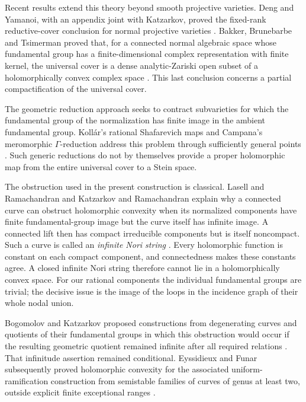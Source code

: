 Recent results extend this theory beyond smooth projective varieties.
Deng and Yamanoi, with an appendix joint with Katzarkov, proved the
fixed-rank reductive-cover conclusion for normal projective varieties
\citep[Theorem~C(i)]{DengYamanoi2024}. Bakker, Brunebarbe and Tsimerman
proved that, for a connected normal algebraic space whose fundamental
group has a finite-dimensional complex representation with finite
kernel, the universal cover is a dense analytic-Zariski open subset
of a holomorphically convex complex space
\citep[Theorem~1.1]{BakkerBrunebarbeTsimerman2026}. This last conclusion
concerns a partial compactification of the universal cover.

The geometric reduction approach seeks to contract subvarieties for which
the fundamental group of the normalization has finite image in the ambient
fundamental group. Koll\'ar's rational Shafarevich maps
and Campana's meromorphic $\Gamma$-reduction address this problem through
sufficiently general points \citep[\S1]{Kollar1993}
\citep[Theorem~3.5 and Definition~3.8]{Campana1994}.
Such generic reductions do not by themselves provide a proper holomorphic
map from the entire universal cover to a Stein space.

The obstruction used in the present construction is classical.
Lasell and Ramachandran \citep[pp.~136--137]{LasellRamachandran1996}
and Katzarkov and Ramachandran
\citep[pp.~527--528]{KatzarkovRamachandran1998} explain why a
connected curve can obstruct holomorphic convexity when its normalized
components have finite fundamental-group image but the curve itself has
infinite image. A connected lift then has compact irreducible
components but is itself noncompact. Such a curve is called an
\emph{infinite Nori string}
\citep[arXiv version, Definition~3]{ColtoiuJoita2011}.
Every holomorphic function is constant on each compact component,
and connectedness makes these constants agree. A closed infinite Nori
string therefore cannot lie in a holomorphically convex space.
For our rational components the individual fundamental groups are
trivial; the decisive issue is the image of the loops in the incidence
graph of their whole nodal union.

Bogomolov and Katzarkov proposed constructions from degenerating
curves and quotients of their fundamental groups in which this
obstruction would occur if the resulting geometric quotient remained
infinite after all required relations
\citep[author manuscript, \S4.1, Lemma~4.2 and Conjecture~4.1]{BogomolovKatzarkov1998}.
That infinitude assertion remained conditional. Eyssidieux and Funar
subsequently proved holomorphic convexity for the associated
uniform-ramification construction from semistable families of curves
of genus at least two, outside explicit finite exceptional ranges
\citep[Theorems~1.2 and~6.18]{EyssidieuxFunar}.

